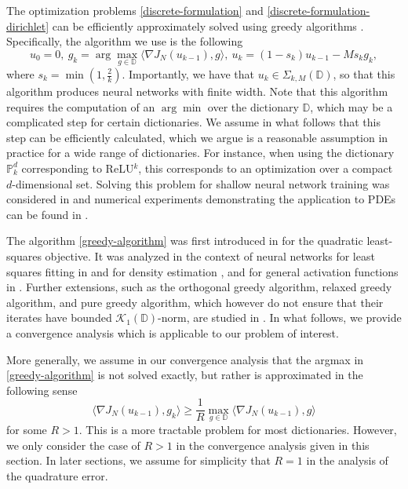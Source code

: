  The optimization problems \eqref{discrete-formulation} and \eqref{discrete-formulation-dirichlet} can be efficiently approximately solved using greedy algorithms \cite{zhang2003sequential,lee1996efficient,jones1992simple,li1999mixture,barron2008approximation}. Specifically, the algorithm we use is the following
\begin{equation}\label{greedy-algorithm}
 u_0 = 0,~g_k = \arg\max_{g\in \mathbb{D}} \langle \nabla J_N(u_{k-1}), g\rangle,~u_k = (1-s_k)u_{k-1} - Ms_kg_k,
\end{equation}
where $s_k = \min\left(1,\frac{2}{k}\right)$. Importantly, we have that $u_k\in \Sigma_{k,M}(\mathbb{D})$, so that this algorithm produces neural networks with finite width. Note that this algorithm requires the computation of an $\arg\min$ over the dictionary $\mathbb{D}$, which may be a complicated step for certain dictionaries. We assume in what follows that this step can be efficiently calculated, which we argue is a reasonable assumption in practice for a wide range of dictionaries. For instance, when using the dictionary $\mathbb{P}_k^d$ corresponding to ReLU$^k$, this corresponds to an optimization over a compact $d$-dimensional set. Solving this problem for shallow neural network training was considered in \cite{lee1996efficient} and numerical experiments demonstrating the application to PDEs can be found in \cite{hao2021efficient}.

The algorithm \eqref{greedy-algorithm} was first introduced in \cite{jones1992simple} for the quadratic least-squares objective. It was analyzed in the context of neural networks for least squares fitting in \cite{lee1996efficient} and for density estimation \cite{li1999mixture}, and for general activation functions in \cite{zhang2003sequential}. Further extensions, such as the orthogonal greedy algorithm, relaxed greedy algorithm, and pure greedy algorithm, which however do not ensure that their iterates have bounded $\mathcal{K}_1(\mathbb{D})$-norm, are studied in \cite{devore1996some,barron2008approximation,temlyakov2008greedy,livshits2009lower,livshitz2003two,sil2004rate}. In what follows, we provide a convergence analysis which is applicable to our problem of interest.

More generally, we assume in our convergence analysis that the argmax in \eqref{greedy-algorithm} is not solved exactly, but rather is approximated in the following sense
\begin{equation}\label{argmax-approximation}
 \langle \nabla J_N(u_{k-1}), g_k\rangle \geq \frac{1}{R}\max_{g\in \mathbb{D}} \langle \nabla J_N(u_{k-1}), g\rangle
 \end{equation}
for some $R > 1$. This is a more tractable problem for most dictionaries. However, we only consider the case of $R > 1$ in the convergence analysis given in this section. In later sections, we assume for simplicity that $R = 1$ in the analysis of the quadrature error.

